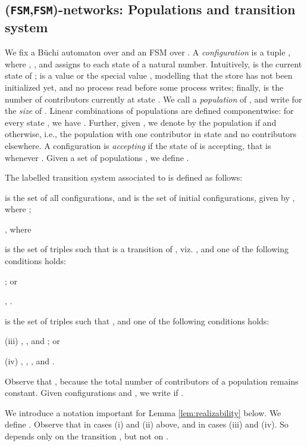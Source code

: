 \documentclass{llncs}
\begin{document}
\subsection{(\texttt{FSM},\texttt{FSM})-networks: Populations and transition system} 
\label{subsec:TS} 
We fix a B\"uchi automaton  over  and an FSM  
over . A {\em configuration} 
is a tuple , where , , and  
assigns to each state of  a natural number. Intuitively,  
is the current state of ;  is a value or the special value , 
modelling that the store has not been initialized yet, and no process
read before some process writes; finally,  is the number of contributors 
currently at state . We call  a {\em population} of , and write  for
the {\em size} of . Linear combinations
of populations are defined componentwise: for every
state , we have . Further, given , we denote by  the population
 if  and  otherwise,
i.e., the population with one contributor in state  and no contributors elsewhere.
A configuration is \emph{accepting} if the state of  is accepting, that is whenever .
Given a set of populations , we define 
. 

The labelled transition system  associated to  is defined
as follows:  
\begin{compactitem}
\item  is the set of all configurations, and  is
 the set of initial configurations, given by , where ;
\item , where
  \begin{compactitem}
  \item  is the set of triples 
  such that  is a transition of , viz. , and one of the following conditions holds:
  \begin{inparaenum}[(i)]
  \item ; or
  \item , .
  \end{inparaenum}
  \item  is the set of triples 
  \noindent such that , and one of the following conditions holds:
  \begin{inparaenum}
  \item[(iii)] , , and 
  ; or
  \item[(iv)] , , , 
  and .
  \end{inparaenum}
  \end{compactitem}
  Observe that ,
  because the total number of contributors  of a population remains constant.
Given configurations  and , 
we write  if . 
  \end{compactitem}
We introduce a notation important for Lemma \ref{lem:realizability} below.
We define . 
Observe that
 in cases (i) and (ii) above, and  
in cases (iii) and (iv). So  depends only on the transition ,
but not on .  
\end{document}
